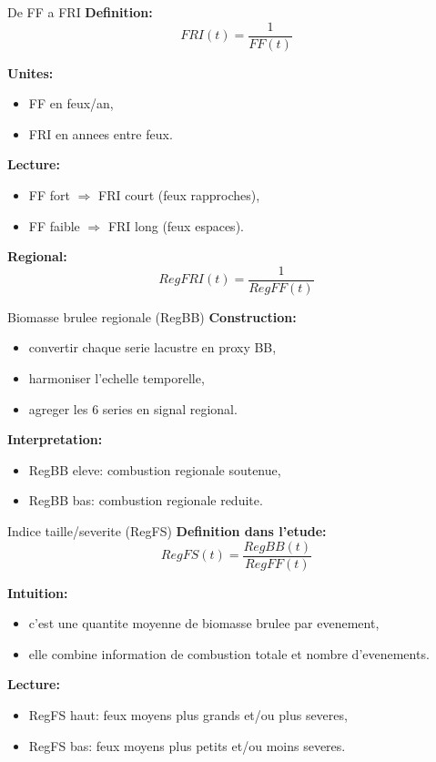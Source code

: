 \documentclass[aspectratio=169,11pt]{beamer}
\begin{document}
\begin{frame}{De FF a FRI}
\textbf{Definition:}
\[
FRI(t) = \frac{1}{FF(t)}
\]

\textbf{Unites:}
\begin{itemize}
  \item FF en feux/an,
  \item FRI en annees entre feux.
\end{itemize}

\textbf{Lecture:}
\begin{itemize}
  \item FF fort \(\Rightarrow\) FRI court (feux rapproches),
  \item FF faible \(\Rightarrow\) FRI long (feux espaces).
\end{itemize}

\textbf{Regional:}
\[
RegFRI(t) = \frac{1}{RegFF(t)}
\]
\end{frame}

\begin{frame}{Biomasse brulee regionale (RegBB)}
\textbf{Construction:}
\begin{itemize}
  \item convertir chaque serie lacustre en proxy BB,
  \item harmoniser l'echelle temporelle,
  \item agreger les 6 series en signal regional.
\end{itemize}

\textbf{Interpretation:}
\begin{itemize}
  \item RegBB eleve: combustion regionale soutenue,
  \item RegBB bas: combustion regionale reduite.
\end{itemize}
\end{frame}

\begin{frame}{Indice taille/severite (RegFS)}
\textbf{Definition dans l'etude:}
\[
RegFS(t) = \frac{RegBB(t)}{RegFF(t)}
\]

\textbf{Intuition:}
\begin{itemize}
  \item c'est une quantite moyenne de biomasse brulee par evenement,
  \item elle combine information de combustion totale et nombre d'evenements.
\end{itemize}

\textbf{Lecture:}
\begin{itemize}
  \item RegFS haut: feux moyens plus grands et/ou plus severes,
  \item RegFS bas: feux moyens plus petits et/ou moins severes.
\end{itemize}
\end{frame}
\end{document}
